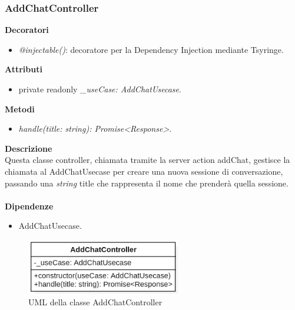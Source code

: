 \subsubsection{AddChatController}
\textbf{Decoratori}
\begin{itemize}
    \item \textit{@injectable()}: decoratore per la Dependency Injection mediante Tsyringe.
\end{itemize}
\textbf{Attributi}
\begin{itemize}
    \item private readonly \textit{\_useCase: AddChatUsecase}.
\end{itemize}
\textbf{Metodi}
\begin{itemize}
    \item \textit{handle(title: string): Promise<Response>}.
\end{itemize}
\textbf{Descrizione}\\
Questa classe controller, chiamata tramite la server action addChat, gestisce la chiamata al AddChatUsecase per creare una nuova sessione di conversazione, passando una \textit{string} title che rappresenta il nome che prenderà quella sessione.\\ \\
\textbf{Dipendenze}
\begin{itemize}
    \item AddChatUsecase.
\end{itemize}

\begin{figure}[h!]
    \centering  
    \includegraphics[width=0.6\textwidth]{AddChatController.png}
    \caption{UML della classe AddChatController}
\end{figure}

